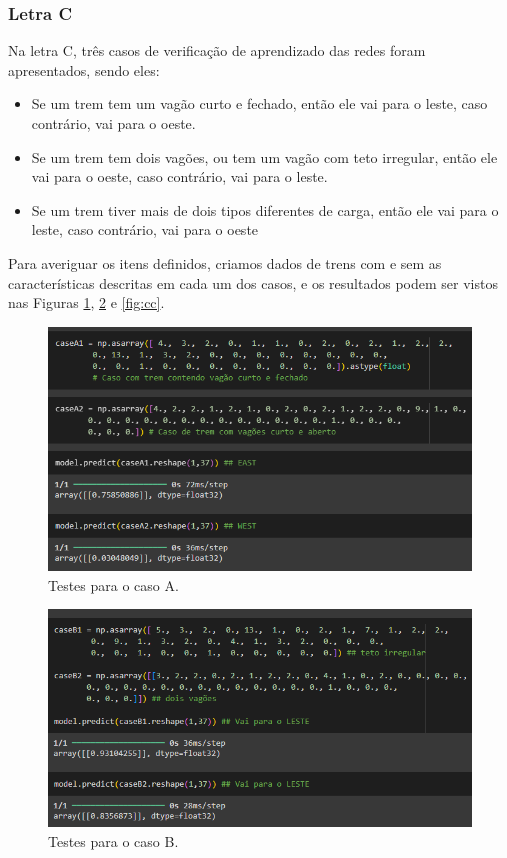 \documentclass[12pt]{article}
\begin{document}
\subsubsection{Letra C}
Na letra C, três casos de verificação de aprendizado das redes foram apresentados, sendo eles:

\begin{itemize}
    \item Se um trem tem um vagão curto e fechado, então ele vai para o leste, caso
contrário, vai para o oeste.
    \item Se um trem tem dois vagões, ou tem um vagão com teto irregular, então ele
vai para o oeste, caso contrário, vai para o leste.
    \item Se um trem tiver mais de dois tipos diferentes de carga, então ele vai para o
leste, caso contrário, vai para o oeste
\end{itemize}

Para averiguar os itens definidos, criamos dados de trens com e sem as características descritas em cada um dos casos, e os resultados podem ser vistos nas Figuras \ref{fig:ca}, \ref{fig:cb} e \ref{fig:cc}.

\begin{figure}[H]
    \centering
    \includegraphics[width=0.8\linewidth]{3CA.png}
    \caption{Testes para o caso A.}
    \label{fig:ca}
\end{figure}

\begin{figure}[H]
    \centering
    \includegraphics[width=0.8\linewidth]{3CB.png}
    \caption{Testes para o caso B.}
    \label{fig:cb}
\end{figure}
\end{document}

